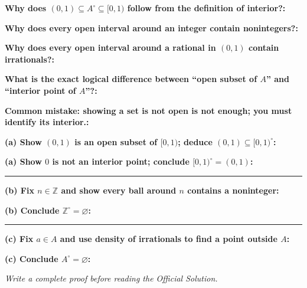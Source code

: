 \documentclass[12pt]{article}
\newcommand{\fillfield}[1]{%
  \par\noindent\textbf{#1:}\enspace\hrulefill\par\vspace{3pt}%
}
\newcommand{\writespace}[1]{\vspace{#1}}
\begin{document}
\bigskip

\begin{tcolorbox}[
  enhanced, breakable,
  colback  = pass3orange,
  colframe = orange!65!black,
  fonttitle = \bfseries,
  title = {Pass 3 \enspace\textbf{--}\enspace Self-Explanation}
]
\fillfield{Why does $(0,1) \subseteq A^\circ \subseteq [0,1)$ follow from the definition of interior?}
\fillfield{Why does every open interval around an integer contain nonintegers?}
\fillfield{Why does every open interval around a rational in $(0,1)$ contain irrationals?}
\fillfield{What is the exact logical difference between ``open subset of $A$'' and ``interior point of $A$''?}
\fillfield{Common mistake: showing a set is not open is not enough; you must identify its interior.}
\end{tcolorbox}

\newpage

\begin{tcolorbox}[
  enhanced, breakable,
  colback  = pass4purple,
  colframe = purple!55!black,
  fonttitle = \bfseries,
  title = {Pass 4 \enspace\textbf{--}\enspace Skeleton Proof}
]
\noindent\textbf{(a) Show $(0,1)$ is an open subset of $[0,1)$; deduce $(0,1)\subseteq [0,1)^\circ$:}\par
\writespace{1.4cm}
\noindent\textbf{(a) Show $0$ is not an interior point; conclude $[0,1)^\circ = (0,1)$:}\par
\writespace{1.4cm}

\noindent\rule{\linewidth}{0.4pt}\vspace{2pt}

\noindent\textbf{(b) Fix $n\in\mathbb{Z}$ and show every ball around $n$ contains a noninteger:}\par
\writespace{1.4cm}
\noindent\textbf{(b) Conclude $\mathbb{Z}^\circ = \varnothing$:}\par
\writespace{0.8cm}

\noindent\rule{\linewidth}{0.4pt}\vspace{2pt}

\noindent\textbf{(c) Fix $a\in A$ and use density of irrationals to find a point outside $A$:}\par
\writespace{1.6cm}
\noindent\textbf{(c) Conclude $A^\circ = \varnothing$:}\par
\writespace{0.8cm}
\end{tcolorbox}

\newpage

\begin{tcolorbox}[
  enhanced, breakable,
  colback  = pass5gray,
  colframe = black!38,
  fonttitle = \bfseries,
  title = {Pass 5 \enspace\textbf{--}\enspace Full Proof Attempt}
]
\small\itshape Write a complete proof before reading the Official Solution.\par
\normalfont\normalsize
\writespace{19cm}
\end{tcolorbox}
\end{document}
